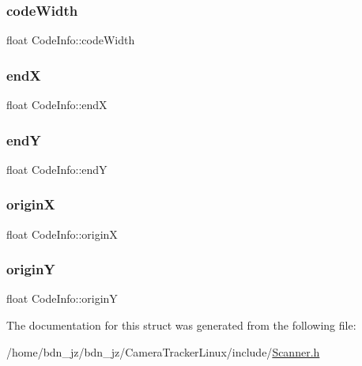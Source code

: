 \mbox{\label{struct_code_info_ab8493ec1c1f670d1060bde6c261f9e80}} 
\subsubsection{\texorpdfstring{code\+Width}{codeWidth}}
{\footnotesize\ttfamily float Code\+Info\+::code\+Width}

\mbox{\label{struct_code_info_afcbf3d398415769aba6f875c29395ec7}} 
\subsubsection{\texorpdfstring{endX}{endX}}
{\footnotesize\ttfamily float Code\+Info\+::endX}

\mbox{\label{struct_code_info_a8d3d91e8e32d9294b514950029755841}} 
\subsubsection{\texorpdfstring{endY}{endY}}
{\footnotesize\ttfamily float Code\+Info\+::endY}

\mbox{\label{struct_code_info_aaf7a04108a44c795809b1c0322f53a9b}} 
\subsubsection{\texorpdfstring{originX}{originX}}
{\footnotesize\ttfamily float Code\+Info\+::originX}

\mbox{\label{struct_code_info_aa4dab88d16276786b4556f021fd192f7}} 
\subsubsection{\texorpdfstring{originY}{originY}}
{\footnotesize\ttfamily float Code\+Info\+::originY}



The documentation for this struct was generated from the following file\+:\begin{DoxyCompactItemize}
\item 
/home/bdn\+\_\+jz/bdn\+\_\+jz/\+Camera\+Tracker\+Linux/include/\hyperlink{_scanner_8h}{Scanner.\+h}\end{DoxyCompactItemize}
